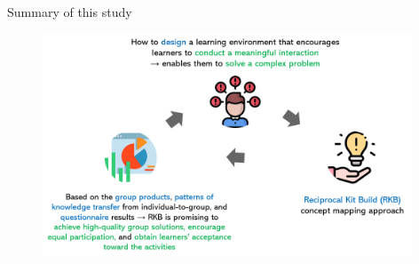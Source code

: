 \begin{frame}{Summary of this study}
    

   \begin{figure}[tb]
       \begin{center}
           \includegraphics[width=110mm]{images/summary.png} 
       \end{center}
       \label{summary::thesis}
   \end{figure}


    
\end{frame}



